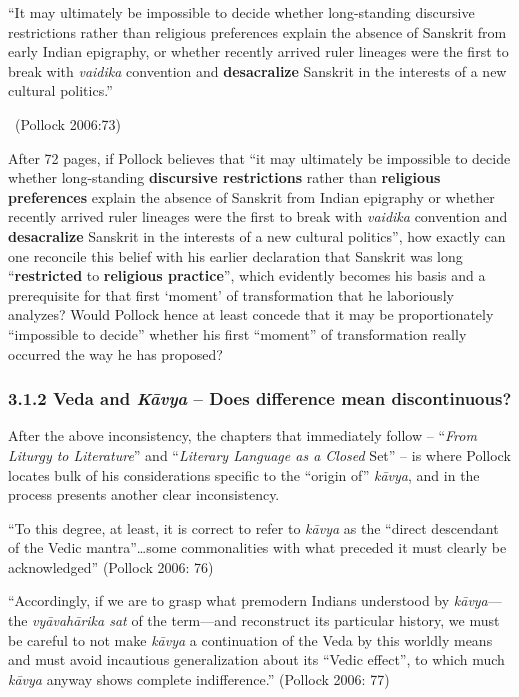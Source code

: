 \begin{myquote}
“It may ultimately be impossible to decide whether long-standing discursive restrictions rather than religious preferences explain the absence of Sanskrit from early Indian epigraphy, or whether recently arrived ruler lineages were the first to break with \textit{vaidika} convention and \textbf{desacralize} Sanskrit in the interests of a new cultural politics.” 

~\hfill (Pollock 2006:73)
\end{myquote}

After 72 pages, if Pollock believes that “it may ultimately be impossible to decide whether long-standing \textbf{discursive restrictions} rather than \textbf{religious preferences} explain the absence of Sanskrit from Indian epigraphy or whether recently arrived ruler lineages were the first to break with \textit{vaidika} convention and \textbf{desacralize} Sanskrit in the interests of a new cultural politics”, how exactly can one reconcile this belief with his earlier declaration that Sanskrit was long “\textbf{restricted} to \textbf{religious practice}”, which evidently becomes his basis and a prerequisite for that first ‘moment’ of transformation that he laboriously analyzes? Would Pollock hence at least concede that it may be proportionately “impossible to decide” whether his first “moment” of transformation really occurred the way he has proposed?


\subsubsection*{3.1.2 Veda and \textit{Kāvya} – Does difference mean discontinuous?}

After the above inconsistency, the chapters that immediately follow – “\textit{From Liturgy to Literature}” and “\textit{Literary Language as a Closed} Set” – is where Pollock locates bulk of his considerations specific to the “origin of” \textit{kāvya}, and in the process presents another clear inconsistency.

\begin{myquote}
“To this degree, at least, it is correct to refer to \textit{kāvya} as the “direct descendant of the Vedic mantra”…some commonalities with what preceded it must clearly be acknowledged” \hfill (Pollock 2006: 76)
\end{myquote}

\begin{myquote}
“Accordingly, if we are to grasp what premodern Indians understood by \textit{kāvya}—the \textit{vyāvahārika sat} of the term—and reconstruct its particular history, we must be careful to not make \textit{kāvya} a continuation of the Veda by this worldly means and must avoid incautious generalization about its “Vedic effect”, to which much \textit{kāvya} anyway shows complete indifference.” \hfill (Pollock 2006: 77)
\end{myquote}

